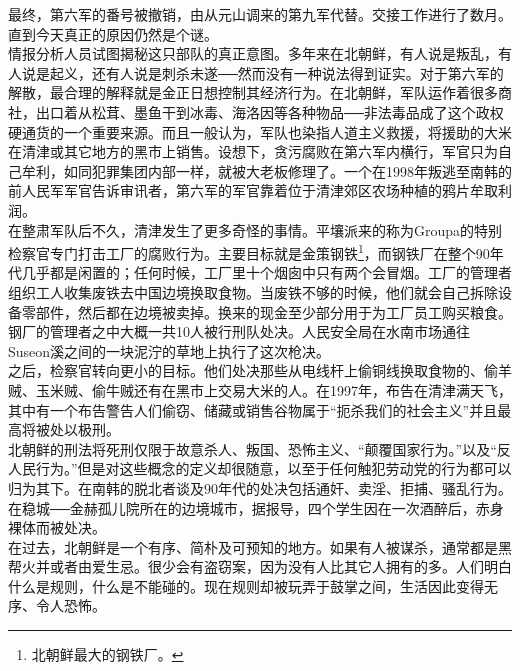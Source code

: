 最终，第六军的番号被撤销，由从元山调来的第九军代替。交接工作进行了数月。直到今天真正的原因仍然是个谜。\\

情报分析人员试图揭秘这只部队的真正意图。多年来在北朝鲜，有人说是叛乱，有人说是起义，还有人说是刺杀未遂──然而没有一种说法得到证实。对于第六军的解散，最合理的解释就是金正日想控制其经济行为。在北朝鲜，军队运作着很多商社，出口着从松茸、墨鱼干到冰毒、海洛因等各种物品──非法毒品成了这个政权硬通货的一个重要来源。而且一般认为，军队也染指人道主义救援，将援助的大米在清津或其它地方的黑市上销售。设想下，贪污腐败在第六军内横行，军官只为自己牟利，如同犯罪集团内部一样，就被大老板修理了。一个在1998年叛逃至南韩的前人民军军官告诉审讯者，第六军的军官靠着位于清津郊区农场种植的鸦片牟取利润。\\

在整肃军队后不久，清津发生了更多奇怪的事情。平壤派来的称为Groupa的特别检察官专门打击工厂的腐败行为。主要目标就是金策钢铁\footnote{北朝鲜最大的钢铁厂。}，而钢铁厂在整个90年代几乎都是闲置的；任何时候，工厂里十个烟囱中只有两个会冒烟。工厂的管理者组织工人收集废铁去中国边境换取食物。当废铁不够的时候，他们就会自己拆除设备零部件，然后都在边境被卖掉。换来的现金至少部分用于为工厂员工购买粮食。\\

钢厂的管理者之中大概一共10人被行刑队处决。人民安全局在水南市场通往Suseon溪之间的一块泥泞的草地上执行了这次枪决。\\

之后，检察官转向更小的目标。他们处决那些从电线杆上偷铜线换取食物的、偷羊贼、玉米贼、偷牛贼还有在黑市上交易大米的人。在1997年，布告在清津满天飞，其中有一个布告警告人们偷窃、储藏或销售谷物属于“扼杀我们的社会主义”并且最高将被处以极刑。\\

北朝鲜的刑法将死刑仅限于故意杀人、叛国、恐怖主义、“颠覆国家行为。”以及“反人民行为。”但是对这些概念的定义却很随意，以至于任何触犯劳动党的行为都可以归为其下。在南韩的脱北者谈及90年代的处决包括通奸、卖淫、拒捕、骚乱行为。在稳城──金赫孤儿院所在的边境城市，据报导，四个学生因在一次酒醉后，赤身裸体而被处决。\\

在过去，北朝鲜是一个有序、简朴及可预知的地方。如果有人被谋杀，通常都是黑帮火并或者由爱生忌。很少会有盗窃案，因为没有人比其它人拥有的多。人们明白什么是规则，什么是不能碰的。现在规则却被玩弄于鼓掌之间，生活因此变得无序、令人恐怖。\\
